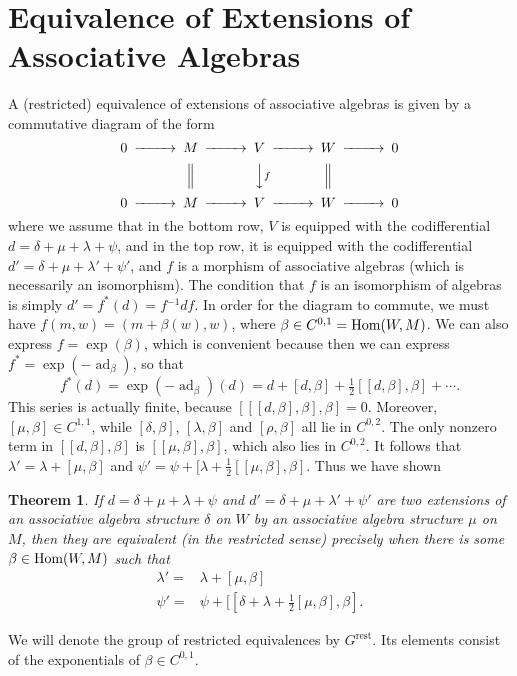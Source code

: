 \documentclass[12pt]{amsart}
\newtheorem{thm}{Theorem}[section]
\theoremstyle{definition}
\begin{document}
\section{Equivalence of Extensions of Associative
Algebras}\label{sec3} A (restricted) equivalence of extensions of
associative algebras is given by a commutative diagram of the form
$$
\begin{CD}
0@>>>M@>>>V@>>>W@>>>0\\
@.@|@VVfV@|\\
0@>>>M@>>>V@>>>W@>>>0\\
\end{CD}
$$
where we assume that in  the bottom row, $V$ is equipped with the
codifferential $d=\delta+\mu+\lambda+\psi$, and in the top row, it
is equipped with the codifferential
$d'=\delta+\mu+\lambda'+\psi'$, and $f$ is a morphism of
associative algebras (which is necessarily an isomorphism). The
condition that $f$ is an isomorphism of algebras is simply $d'=f^*(d)=f{^{-1}} d
f$. In order for the diagram to commute, we must have
$f(m,w)=(m+\beta(w),w)$, where $\beta\in C^{0,1}={\mbox{\rm Hom}}(W,M)$. We
can also express $f=\exp(\beta)$, which is convenient because then we can express
$f^*=\exp(-{\operatorname{ad}}_\beta)$, so that
\begin{equation}
f^*(d)=\exp(-{\operatorname{ad}}_\beta)(d)=d+[d,\beta]+\tfrac12[[d,\beta],\beta]+\cdots.
\end{equation}
This series is actually finite, because $[[[d,\beta],\beta],\beta]=0$. Moreover,
$[\mu,\beta]\in C^{1,1}$, while
$[\delta,\beta]$, $[\lambda,\beta]$ and $[\rho,\beta]$ all lie in $C^{0,2}$. The only nonzero term in
$[[d,\beta],\beta]$ is $[[\mu,\beta],\beta]$, which also lies in $C^{0,2}$. It follows that
$
\lambda'=\lambda+[\mu,\beta]$ and $
\psi'=\psi+[\lambda+\tfrac12[[\mu,\beta],\beta]$. Thus we have shown
\begin{thm} If $d=\delta+\mu+\lambda+\psi$ and $d'=\delta+\mu+\lambda'+\psi'$ are
two extensions of an associative algebra structure $\delta$ on $W$ by an associative algebra structure
$\mu$ on $M$, then they are equivalent (in the restricted sense) precisely when there is some $\beta\in{\mbox{\rm Hom}}(W,M)$
such that
\begin{align}\label{equivext}
\lambda'=&\lambda+[\mu,\beta]\\
\psi'=&\psi+[[\delta+\lambda+\tfrac12[\mu,\beta],\beta]\label{equivext2}.
\end{align}
\end{thm}
We will denote the group of restricted equivalences by ${\mbox{$G^{\text{rest}}$}}$. Its
elements consist of the exponentials of $\beta\in C^{0,1}$.
\end{document}
